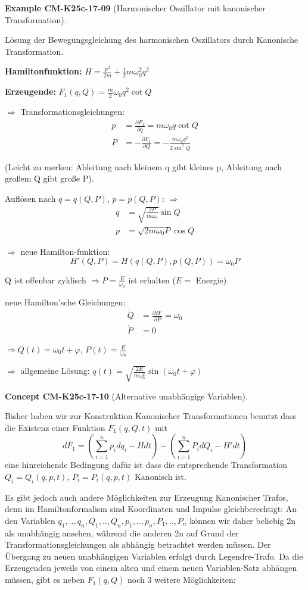 \documentclass[10pt, letterpaper]{article}
\newcommand{\CustomHeading}[3]{%
  \par\medskip\noindent%
  \textbf{#1 #2} \textnormal{(#3)}.\enskip%
}
\newenvironment{EXA}[2]{\CustomHeading{Example}{#1}{#2}}{}
\newenvironment{CONC}[2]{\CustomHeading{Concept}{#1}{#2}}{}
\begin{document}
\begin{EXA}{CM-K25c-17-09}{Harmonischer Oszillator mit kanonischer Transformation}
Lösung der Bewegungsgleichung des harmonischen Oszillators durch Kanonische Transformation.

\textbf{Hamiltonfunktion:} $H = \frac{p^2}{2m} + \frac{1}{2}m\omega_0^2q^2$

\textbf{Erzeugende:} $F_1(q,Q) = \frac{m}{2}\omega_0q^2\cot Q$

$\Rightarrow$ Transformationsgleichungen:
\begin{align*}
p &= \frac{\partial F_1}{\partial q} = m\omega_0q\cot Q\\
P &= -\frac{\partial F_1}{\partial Q} = -\frac{m\omega_0q^2}{2\sin^2 Q}
\end{align*}

(Leicht zu merken: Ableitung nach kleinem q gibt kleines p, Ableitung nach großem Q gibt große P).

Auflösen nach $q = q(Q,P)$, $p = p(Q,P)$: $\Rightarrow$
\begin{align*}
q &= \sqrt{\frac{2P}{m\omega_0}}\sin Q\\
p &= \sqrt{2m\omega_0P}\cos Q
\end{align*}

$\Rightarrow$ neue Hamilton-funktion:
\[H'(Q,P) = H(q(Q,P), p(Q,P)) = \omega_0P\]

Q ist offenbar zyklisch $\Rightarrow P = \frac{E}{\omega_0}$ ist erhalten ($E = $ Energie)

neue Hamilton'sche Gleichungen:
\begin{align*}
\dot{Q} &= \frac{\partial H'}{\partial P} = \omega_0\\
\dot{P} &= 0
\end{align*}

$\Rightarrow Q(t) = \omega_0t + \varphi$, $P(t) = \frac{E}{\omega_0}$

$\Rightarrow$ allgemeine Lösung: $q(t) = \sqrt{\frac{2E}{m\omega_0^2}}\sin(\omega_0t + \varphi)$
\end{EXA}

\begin{CONC}{CM-K25c-17-10}{Alternative unabhängige Variablen}
Bisher haben wir zur Konstruktion Kanonischer Transformationen benutzt dass die Existenz einer Funktion $F_1(q,Q,t)$ mit
\[dF_1 = \left(\sum_{i=1}^n p_i dq_i - H dt\right) - \left(\sum_{i=1}^n P_i dQ_i - H' dt\right)\]
eine hinreichende Bedingung dafür ist dass die entsprechende Transformation $Q_i = Q_i(q,p,t)$, $P_i = P_i(q,p,t)$ Kanonisch ist.

Es gibt jedoch auch andere Möglichkeiten zur Erzeugung Kanonischer Trafos, denn im Hamiltonformalism sind Koordinaten und Impulse gleichberechtigt: An den Variablen $q_1,..,q_n,Q_1,..,Q_n,p_1,..,p_n,P_1,..,P_n$ können wir daher beliebig 2n als unabhängig ansehen, während die anderen 2n auf Grund der Transformationsgleichungen als abhängig betrachtet werden müssen. Der Übergang zu neuen unabhängigen Variablen erfolgt durch Legendre-Trafo. Da die Erzeugenden jeweils von einem alten und einem neuen Variablen-Satz abhängen müssen, gibt es neben $F_1(q,Q)$ noch 3 weitere Möglichkeiten:
\end{CONC}
\end{document}
